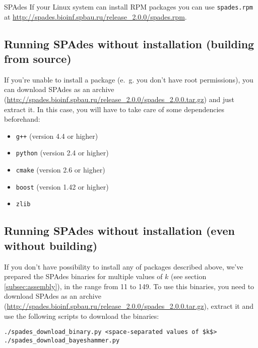 \documentclass{article}
\def\spades{SPAdes}
\begin{document}
{\spades} If your Linux system can install RPM packages you can use {\tt spades.rpm}
at \url{http://spades.bioinf.spbau.ru/release_2.0.0/spades.rpm}.

\subsection{Running {\spades} without installation (building from source)}

If you're unable to install a package (e.~g. you don't have root permissions),
you can download {\spades} as an archive (\url{http://spades.bioinf.spbau.ru/release_2.0.0/spades_2.0.0.tar.gz}) and just extract it.
In this case, you will have to take care of some dependencies beforehand:
\begin{itemize}
\item {\tt g++} (version 4.4 or higher)
\item {\tt python} (version 2.4 or higher)
\item {\tt cmake} (version 2.6 or higher)
\item {\tt boost} (version 1.42 or higher)
\item {\tt zlib}
\end{itemize}

\subsection{Running {\spades} without installation (even without building)}

If you don't have possibility to install any of packages described above,
we've prepared the {\spades} binaries for multiple values of $k$ (see section \ref{subsec:assembly}),
in the range from 11 to 149.
To use this binaries, you need to download {\spades} as an archive (\url{http://spades.bioinf.spbau.ru/release_2.0.0/spades_2.0.0.tar.gz}),
extract it and use the following scripts to download the binaries:
\begin{lstlisting}
./spades_download_binary.py <space-separated values of $k$>
./spades_download_bayeshammer.py
\end{lstlisting}
\end{document}
